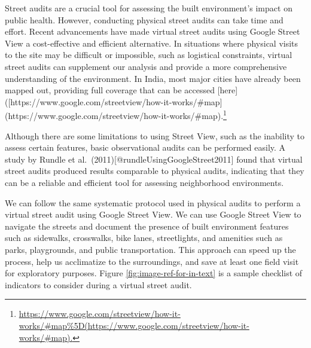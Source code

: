 \documentclass[
]{latex/krantz}
\renewcommand{\href}[2]{#2\footnote{\url{#1}}}
\DeclareRobustCommand{\href}[2]{#2\footnote{\url{#1}}}
\begin{document}
Street audits are a crucial tool for assessing the built environment's impact on public health. However, conducting physical street audits can take time and effort. Recent advancements have made virtual street audits using Google Street View a cost-effective and efficient alternative. In situations where physical visits to the site may be difficult or impossible, such as logistical constraints, virtual street audits can supplement our analysis and provide a more comprehensive understanding of the environment. In India, most major cities have already been mapped out, providing full coverage that can be accessed {[}here{]}(\href{https://www.google.com/streetview/how-it-works/\#map\%5D(https://www.google.com/streetview/how-it-works/\#map).}{{[}https://www.google.com/streetview/how-it-works/\#map{]}(https://www.google.com/streetview/how-it-works/\#map).}

Although there are some limitations to using Street View, such as the inability to assess certain features, basic observational audits can be performed easily. A study by Rundle et al.~(2011){[}@rundleUsingGoogleStreet2011{]} found that virtual street audits produced results comparable to physical audits, indicating that they can be a reliable and efficient tool for assessing neighborhood environments.

We can follow the same systematic protocol used in physical audits to perform a virtual street audit using Google Street View. We can use Google Street View to navigate the streets and document the presence of built environment features such as sidewalks, crosswalks, bike lanes, streetlights, and amenities such as parks, playgrounds, and public transportation. This approach can speed up the process, help us acclimatize to the surroundings, and save at least one field visit for exploratory purposes. Figure \ref{fig:image-ref-for-in-text} is a sample checklist of indicators to consider during a virtual street audit.
\end{document}
